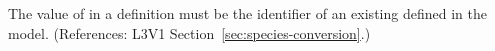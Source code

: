 The value of  in a \Species definition must be the
identifier of an existing \Parameter defined in the model.  (References:
L3V1 Section~\ref{sec:species-conversion}.)